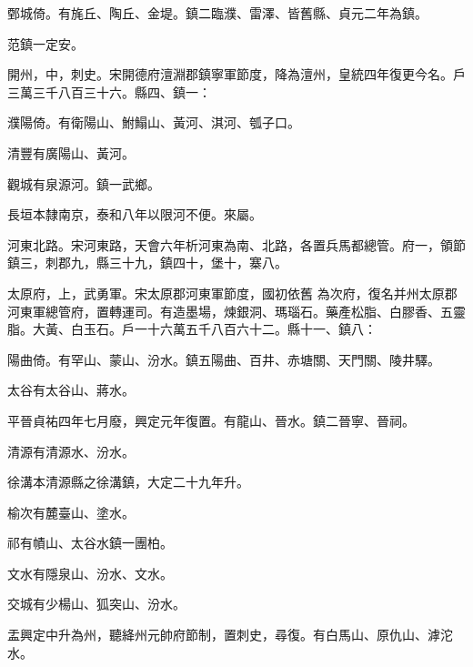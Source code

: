 \begin{pinyinscope}
 鄄城倚。有旄丘、陶丘、金堤。鎮二臨濮、雷澤、皆舊縣、貞元二年為鎮。



 范鎮一定安。



 開州，中，刺史。宋開德府澶淵郡鎮寧軍節度，降為澶州，皇統四年復更今名。戶三萬三千八百三十六。縣四、鎮一：



 濮陽倚。有衛陽山、鮒鰨山、黃河、淇河、瓠子口。



 清豐有廣陽山、黃河。



 觀城有泉源河。鎮一武鄉。



 長垣本隸南京，泰和八年以限河不便。來屬。



 河東北路。宋河東路，天會六年析河東為南、北路，各置兵馬都總管。府一，領節鎮三，刺郡九，縣三十九，鎮四十，堡十，寨八。



 太原府，上，武勇軍。宋太原郡河東軍節度，國初依舊
 為次府，復名并州太原郡河東軍總管府，置轉運司。有造墨場，煉銀洞、瑪瑙石。藥產松脂、白膠香、五靈脂。大黃、白玉石。戶一十六萬五千八百六十二。縣十一、鎮八：



 陽曲倚。有罕山、蒙山、汾水。鎮五陽曲、百井、赤塘關、天門關、陵井驛。



 太谷有太谷山、蔣水。



 平晉貞祐四年七月廢，興定元年復置。有龍山、晉水。鎮二晉寧、晉祠。



 清源有清源水、汾水。



 徐溝本清源縣之徐溝鎮，大定二十九年升。



 榆次有麓臺山、塗水。



 祁有幘山、太谷水鎮一團柏。



 文水有隱泉山、汾水、文水。



 交城有少楊山、狐突山、汾水。



 盂興定中升為州，聽絳州元帥府節制，置刺史，尋復。有白馬山、原仇山、滹沱水。




\end{pinyinscope}
